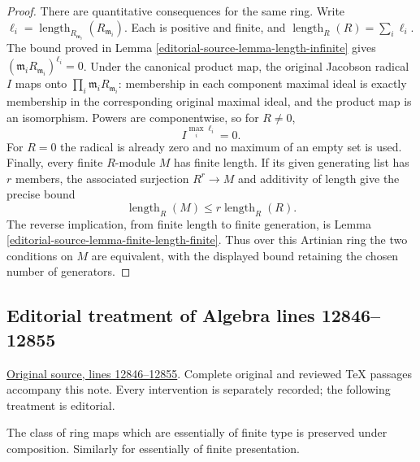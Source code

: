 \begin{proof}
There are quantitative consequences for the same ring.
Write $\ell_i=\operatorname{length}_{R_{\mathfrak m_i}}
(R_{\mathfrak m_i})$. Each is positive and finite, and
$\operatorname{length}_R(R)=\sum_i\ell_i$.
The bound proved in Lemma \ref{editorial-source-lemma-length-infinite} gives
$(\mathfrak m_iR_{\mathfrak m_i})^{\ell_i}=0$.
Under the canonical product map, the original Jacobson radical
$I$ maps onto $\prod_i\mathfrak m_iR_{\mathfrak m_i}$:
membership in each component maximal ideal is exactly membership
in the corresponding original maximal ideal, and the product
map is an isomorphism. Powers are componentwise, so for
$R\neq0$,
$$
I^{\max_i\ell_i}=0.
$$
For $R=0$ the radical is already zero and no maximum of an empty
set is used.
Finally, every finite $R$-module $M$ has finite length. If its
given generating list has $r$ members, the associated surjection
$R^r\to M$ and additivity of length give the precise bound
$$
\operatorname{length}_R(M)\leq
r\operatorname{length}_R(R).
$$
The reverse implication, from finite length to finite generation,
is Lemma \ref{editorial-source-lemma-finite-length-finite}. Thus over this
Artinian ring the two conditions on $M$ are equivalent, with
the displayed bound retaining the chosen number of generators.
\end{proof}


\subsection{Editorial treatment of Algebra lines 12846--12855}

\hypertarget{algebra-context-171}{}

\noindent\href{https://github.com/stacks/stacks-project/blob/a04446e57ec1fbc252a871afcec7752fb2807b14/algebra.tex\#L12846}{Original source, lines 12846--12855}. Complete original and reviewed TeX passages accompany this note. Every intervention is separately recorded; the following treatment is editorial.


\begin{lemma}
\label{editorial-source-lemma-composition-essentially-of-finite-type}
The class of ring maps which are essentially of finite type is
preserved under composition. Similarly for essentially of finite
presentation.
\end{lemma}

